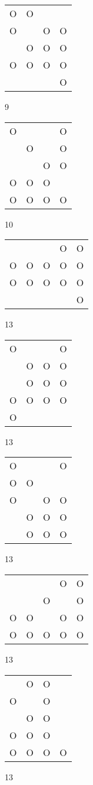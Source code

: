 \begin{tabular}{|m{0.2cm}m{0.2cm}m{0.2cm}m{0.2cm}|}\hline
O&O& & \\
O& &O&O\\
 &O&O&O\\
O&O&O&O\\
 & & &O\\
\hline\end{tabular}9
\begin{tabular}{|m{0.2cm}m{0.2cm}m{0.2cm}m{0.2cm}|}\hline
O& & &O\\
 &O& &O\\
 & &O&O\\
O&O&O& \\
O&O&O&O\\
\hline\end{tabular}10
\begin{tabular}{|m{0.2cm}m{0.2cm}m{0.2cm}m{0.2cm}m{0.2cm}|}\hline
 & & &O&O\\
O&O&O&O&O\\
O&O&O&O&O\\
 & & & &O\\
\hline\end{tabular}13
\begin{tabular}{|m{0.2cm}m{0.2cm}m{0.2cm}m{0.2cm}|}\hline
O& & &O\\
 &O&O&O\\
 &O&O&O\\
O&O&O&O\\
O& & & \\
\hline\end{tabular}13
\begin{tabular}{|m{0.2cm}m{0.2cm}m{0.2cm}m{0.2cm}|}\hline
O& & &O\\
O&O& & \\
O& &O&O\\
 &O&O&O\\
 &O&O&O\\
\hline\end{tabular}13
\begin{tabular}{|m{0.2cm}m{0.2cm}m{0.2cm}m{0.2cm}m{0.2cm}|}\hline
 & & &O&O\\
 & &O& &O\\
O&O& &O&O\\
O&O&O&O&O\\
\hline\end{tabular}13
\begin{tabular}{|m{0.2cm}m{0.2cm}m{0.2cm}m{0.2cm}|}\hline
 &O&O& \\
O& &O& \\
 &O&O& \\
O&O&O& \\
O&O&O&O\\
\hline\end{tabular}13
